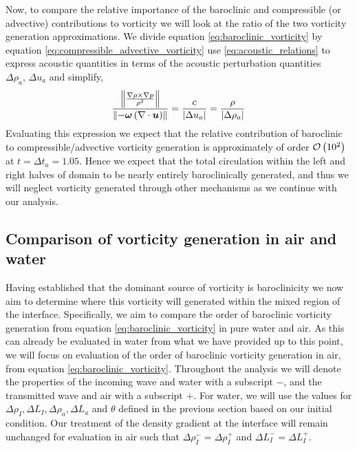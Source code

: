 Now, to compare the relative importance of the baroclinic and
compressible (or advective) contributions to vorticity we will look at
the ratio of the two vorticity generation approximations. We divide
equation \eqref{eq:baroclinic_vorticity} by equation
\eqref{eq:compressible_advective_vorticity} use
\eqref{eq:acoustic_relations} to express acoustic quantities in terms
of the acoustic perturbation quantities $\Delta \rho_a,\,\Delta u_a$ and simplify,
\begin{align} \label{eq:vorticity_comparison}
\frac{\norm{\frac{\nabla\rho\times\nabla p}{\rho^2}}}{\norm{-\boldsymbol{\omega}\left(\nabla\cdot\boldsymbol{u}\right)}} = \frac{c}{\abs{\Delta u_a}} = \frac{\rho}{\abs{\Delta \rho_a}}%
\end{align}
Evaluating this expression we expect that the relative contribution of
baroclinic to compressible/advective vorticity generation is
approximately of order $\mathcal{O}\left(10^2\right)$ at
$t=\Delta t_a=1.05$. Hence we expect that the total circulation within
the left and right halves of domain to be nearly entirely
baroclinically generated, and thus we will neglect vorticity generated
through other mechanisms as we continue with our analysis.

\subsection{Comparison of vorticity generation in air and water}
Having established that the dominant source of vorticity is
baroclinicity we now aim to determine where this vorticity will
generated within the mixed region of the interface. Specifically, we
aim to compare the order of baroclinic vorticity generation from
equation \eqref{eq:baroclinic_vorticity} in pure water and air. As
this can already be evaluated in water from what we have provided up
to this point, we will focus on evaluation of the order of baroclinic
vorticity generation in air, from equation
\eqref{eq:baroclinic_vorticity}. Throughout the analysis we will
denote the properties of the incoming wave and water with a subscript
$-$, and the transmitted wave and air with a subscript $+$. For water,
we will use the values for
$\Delta \rho_I, \Delta L_I, \Delta \rho_a, \Delta L_a$ and $\theta$
defined in the previous section based on our initial condition. Our
treatment of the density gradient at the interface will remain
unchanged for evaluation in air such that
$\Delta \rho_I^-=\Delta \rho_I^+$ and $\Delta L_I^-=\Delta L_I^+$.

